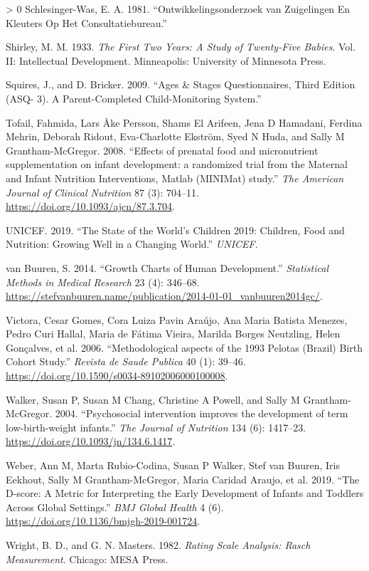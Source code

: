\documentclass[
]{book}
\newlength{\cslhangindent}
\newenvironment{CSLReferences}[3] %
 {%
  \setlength{\parindent}{0pt}
  \ifodd #1 \everypar{\setlength{\hangindent}{\cslhangindent}}\ignorespaces\fi
  \ifnum #2 > 0
  \setlength{\parskip}{#2\baselineskip}
  \fi
 }%
 {}
\begin{document}
\begin{CSLReferences}{1}{0}
\leavevmode\hypertarget{ref-schlesinger1981}{}%
Schlesinger-Was, E. A. 1981. {``Ontwikkelingsonderzoek van Zuigelingen En Kleuters Op Het Consultatiebureau.''}

\leavevmode\hypertarget{ref-shirley1933}{}%
Shirley, M. M. 1933. \emph{The First Two Years: A Study of Twenty-Five Babies}. Vol. II: Intellectual Development. Minneapolis: University of Minnesota Press.

\leavevmode\hypertarget{ref-squires2009}{}%
Squires, J., and D. Bricker. 2009. {``Ages \& Stages Questionnaires, Third Edition (ASQ- 3). A Parent-Completed Child-Monitoring System.''}

\leavevmode\hypertarget{ref-Tofail2008}{}%
Tofail, Fahmida, Lars Åke Persson, Shams El Arifeen, Jena D Hamadani, Ferdina Mehrin, Deborah Ridout, Eva-Charlotte Ekström, Syed N Huda, and Sally M Grantham-McGregor. 2008. {``{Effects of prenatal food and micronutrient supplementation on infant development: a randomized trial from the Maternal and Infant Nutrition Interventions, Matlab (MINIMat) study}.''} \emph{The American Journal of Clinical Nutrition} 87 (3): 704--11. \url{https://doi.org/10.1093/ajcn/87.3.704}.

\leavevmode\hypertarget{ref-unicef2019}{}%
UNICEF. 2019. {``The State of the World's Children 2019: Children, Food and Nutrition: Growing Well in a Changing World.''} \emph{UNICEF}.

\leavevmode\hypertarget{ref-vanbuuren2014}{}%
van Buuren, S. 2014. {``Growth Charts of Human Development.''} \emph{Statistical Methods in Medical Research} 23 (4): 346--68. \url{https://stefvanbuuren.name/publication/2014-01-01_vanbuuren2014gc/}.

\leavevmode\hypertarget{ref-Victora2006}{}%
Victora, Cesar Gomes, Cora Luiza Pavin Araújo, Ana Maria Batista Menezes, Pedro Curi Hallal, Maria de Fátima Vieira, Marilda Borges Neutzling, Helen Gonçalves, et al. 2006. {``{Methodological aspects of the 1993 Pelotas (Brazil) Birth Cohort Study.}''} \emph{Revista de Saude Publica} 40 (1): 39--46. \url{https://doi.org/10.1590/s0034-89102006000100008}.

\leavevmode\hypertarget{ref-Walker2004}{}%
Walker, Susan P, Susan M Chang, Christine A Powell, and Sally M Grantham-McGregor. 2004. {``{Psychosocial intervention improves the development of term low-birth-weight infants.}''} \emph{The Journal of Nutrition} 134 (6): 1417--23. \url{https://doi.org/10.1093/jn/134.6.1417}.

\leavevmode\hypertarget{ref-Weber2019}{}%
Weber, Ann M, Marta Rubio-Codina, Susan P Walker, Stef van Buuren, Iris Eekhout, Sally M Grantham-McGregor, Maria Caridad Araujo, et al. 2019. {``The {D-score}: A Metric for Interpreting the Early Development of Infants and Toddlers Across Global Settings.''} \emph{BMJ Global Health} 4 (6). \url{https://doi.org/10.1136/bmjgh-2019-001724}.

\leavevmode\hypertarget{ref-wright1982}{}%
Wright, B. D., and G. N. Masters. 1982. \emph{Rating Scale Analysis: Rasch Measurement}. Chicago: MESA Press.

\end{CSLReferences}
\end{document}

